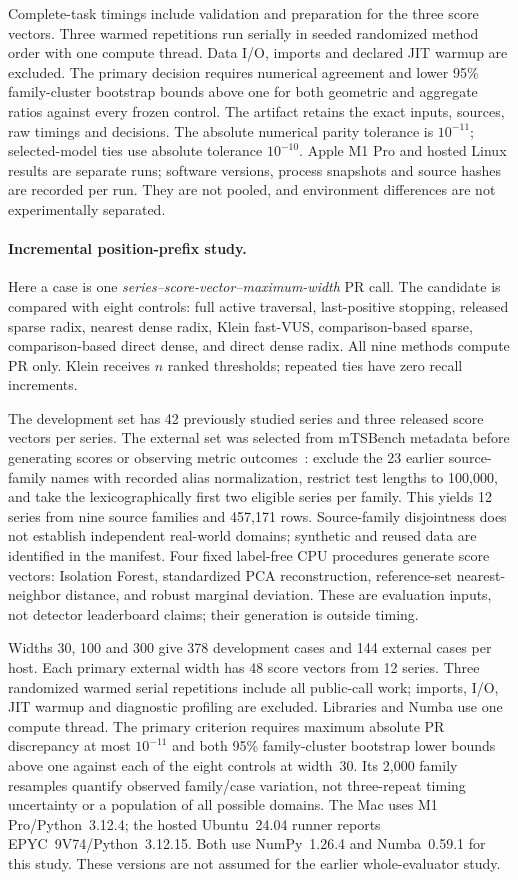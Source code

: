 Complete-task timings include validation and preparation for the three
score vectors. Three warmed repetitions run serially in seeded randomized
method order with one compute thread. Data I/O, imports and declared JIT
warmup are excluded. The primary decision requires numerical agreement and
lower 95\% family-cluster bootstrap bounds above one for both geometric and
aggregate ratios against every frozen control. The artifact retains the
exact inputs, sources, raw timings and decisions. The absolute numerical
parity tolerance is $10^{-11}$; selected-model ties use absolute tolerance
$10^{-10}$.
Apple M1 Pro and hosted Linux results are separate runs; software versions,
process snapshots and source hashes are recorded per run. They are not
pooled, and environment differences are not experimentally separated.

\paragraph{Incremental position-prefix study.}
Here a case is one \emph{series--score-vector--maximum-width} PR call. The
candidate is compared with eight controls: full active traversal,
last-positive stopping, released sparse radix, nearest dense radix,
Klein fast-VUS, comparison-based sparse, comparison-based direct dense,
and direct dense radix. All nine methods compute PR only. Klein receives
$n$ ranked thresholds; repeated ties have zero recall increments.

The development set has 42 previously studied series and three released
score vectors per series. The external set was selected from mTSBench
metadata before generating scores or observing metric outcomes~\cite{mtsbench}:
exclude the 23 earlier source-family names with recorded alias normalization,
restrict test lengths to 100,000, and take the lexicographically first two
eligible series per family. This yields 12 series from nine source families
and 457,171 rows. Source-family disjointness does not establish independent
real-world domains; synthetic and reused data are identified in the manifest.
Four fixed label-free CPU procedures generate score vectors: Isolation Forest,
standardized PCA reconstruction, reference-set nearest-neighbor distance,
and robust marginal deviation. These are evaluation inputs, not detector
leaderboard claims; their generation is outside timing.

Widths 30, 100 and 300 give 378 development cases and 144 external cases
per host. Each primary external width has 48 score vectors from 12 series.
Three randomized warmed serial repetitions include all public-call work;
imports, I/O, JIT warmup and diagnostic profiling are excluded. Libraries
and Numba use one compute thread. The primary criterion requires maximum
absolute PR discrepancy at most $10^{-11}$ and both 95\% family-cluster
bootstrap lower bounds above one against each of the eight controls at
width~30. Its 2,000 family resamples quantify observed family/case variation,
not three-repeat timing uncertainty or a population of all possible domains.
The Mac uses M1 Pro/Python~3.12.4; the hosted Ubuntu~24.04 runner reports
EPYC~9V74/Python~3.12.15. Both use NumPy~1.26.4 and Numba~0.59.1 for this
study. These versions are not assumed for the earlier whole-evaluator study.

